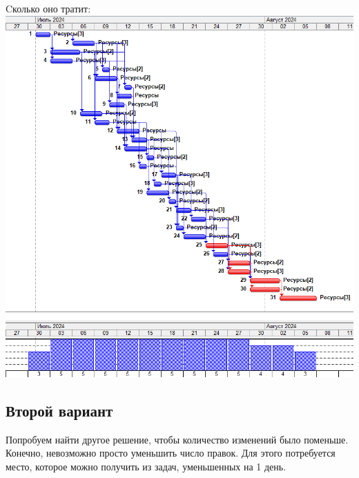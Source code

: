 \documentclass[14pt]{article}
\begin{document}
		{\LARGE Cколько оно тратит:}\\
		\includegraphics[width=\textwidth]{../img/1b1_answer.png}\\ 
	\subsection{Второй вариант}
		Попробуем найти другое решение, чтобы количество изменений было поменьше.
		Конечно, невозможно просто уменьшить число правок.
		Для этого потребуется место, которое можно получить из задач, уменьшенных на 1 день.
		
\end{document}
